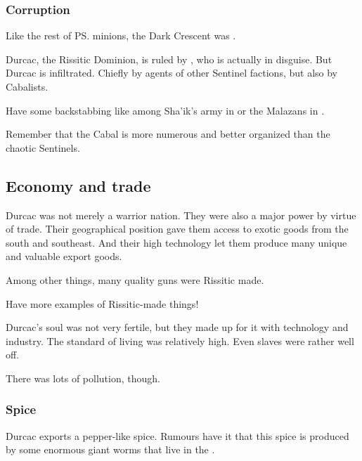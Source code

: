 \subsubsection{Corruption}
Like the rest of \ps{\Secherdamon} minions, the Dark Crescent was . 

Durcac, the Rissitic Dominion, is ruled by \HriistN, who is actually \HriistD{} in disguise. 
But Durcac is infiltrated. 
Chiefly by agents of other Sentinel factions, but also by Cabalists. 

Have some backstabbing like among Sha'ik's army in \cite{StevenErikson:HouseofChains} or the Malazans in \cite{StevenErikson:TheBonehunters}. 

Remember that the Cabal is more numerous and better organized than the chaotic Sentinels. 





\subsection{Economy and trade}
Durcac was not merely a warrior nation. 
They were also a major power by virtue of trade. 
Their geographical position gave them access to exotic goods from the south and southeast. 
And their high technology let them produce many unique and valuable export goods. 

Among other things, many quality guns were Rissitic made. 

Have more examples of Rissitic-made things! 

Durcac's soul was not very fertile, but they made up for it with technology and industry. 
The standard of living was relatively high. 
Even slaves were rather well off. 

There was lots of pollution, though. 





\subsubsection{Spice}
Durcac exports a pepper-like spice. 
Rumours have it that this spice is produced by some enormous giant worms that live in the . 









